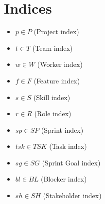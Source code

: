 \documentclass{article}
\begin{document}
\section{Indices}
\begin{itemize}
    \item $p \in P$ (Project index)
    \item $t \in T$ (Team index)
    \item $w \in W$ (Worker index)
    \item $f \in F$ (Feature index)
    \item $s \in S$ (Skill index)
    \item $r \in R$ (Role index)
    \item $sp \in SP$ (Sprint index)
    \item $tsk \in TSK$ (Task index)
    \item $sg \in SG$ (Sprint Goal index)
    \item $bl \in BL$ (Blocker index)
    \item $sh \in SH$ (Stakeholder index)
\end{itemize}
\end{document}
